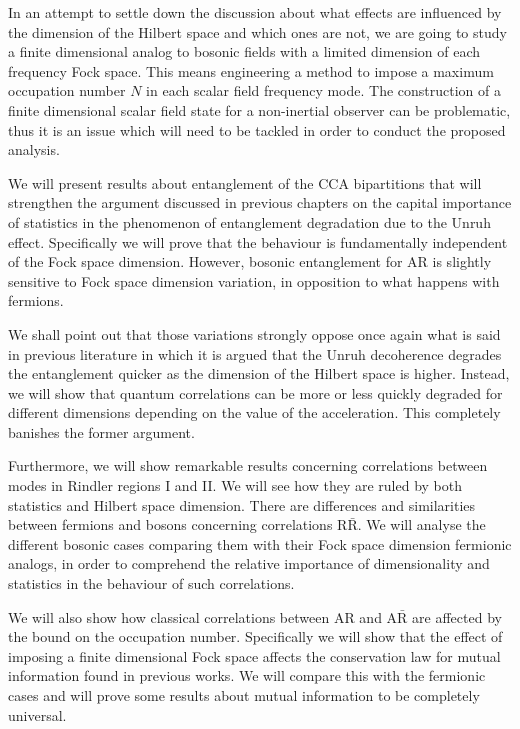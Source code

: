 In an attempt to settle down the discussion about what effects are influenced by the dimension of the Hilbert space and which ones are not, we are going to study a finite dimensional analog to bosonic fields with a limited dimension of each frequency Fock space. This means engineering a method to impose a maximum occupation number $N$ in each scalar field frequency mode. The construction of a finite dimensional scalar field state for a non-inertial observer can be problematic, thus it is an issue which will need to be tackled in order to conduct the proposed analysis.

We will present results about entanglement of the CCA bipartitions that will strengthen the argument discussed in previous chapters on the capital importance of statistics in the phenomenon of entanglement degradation due to the Unruh effect. Specifically we will prove that the behaviour is fundamentally independent of the Fock space dimension. However, bosonic entanglement for AR is slightly sensitive to Fock space dimension variation, in opposition to what happens with fermions. 

We shall point out that those variations strongly oppose once again what is said in previous literature in which it is argued that the Unruh decoherence degrades the entanglement quicker as the dimension of the Hilbert space is higher. Instead, we will show that quantum correlations can be more or less quickly degraded for different dimensions depending on the value of the acceleration. This completely banishes the former argument. 

Furthermore, we will show remarkable results concerning correlations between modes in Rindler regions I and II. We will see how they are ruled by both statistics and Hilbert space dimension. There are differences and similarities between fermions and bosons concerning correlations $\text{R}{\bar{\text{R}}}$. We will analyse the different bosonic cases comparing them with their Fock space dimension fermionic analogs, in order to comprehend the relative importance of dimensionality and statistics in the behaviour of such correlations.

We will also show how classical correlations between AR and $\text{A}{\bar{\text{R}}}$ are affected by the bound on the occupation number. Specifically we will show that the effect of imposing a finite dimensional Fock space affects the conservation law for mutual information found in previous works. We will compare this with the fermionic cases and will prove some results about mutual information to be completely universal.

